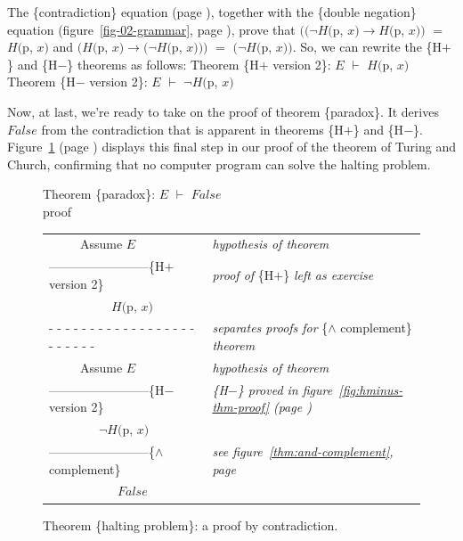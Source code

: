 The \{contradiction\} equation (page \pageref{boolean-contradiction}),
together with the \{double negation\} equation
(figure~\ref{fig-02-grammar}, page \pageref{fig-02-grammar}),
prove that
$((\neg H($\textsf{p}, $x) \rightarrow H($\textsf{p}, $x))$ $=$ $H($\textsf{p}, $x)$
and
$(H($\textsf{p}, $x) \rightarrow (\neg H($\textsf{p}, $x)))$ $=$ $(\neg H($\textsf{p}, $x))$.
So, we can rewrite the \{H$+$\} and \{H$-$\} theorems as follows:
\vspace{2mm}
\label{thm:HplusHminus}
\hspace*{5mm}Theorem \{H$+$ version 2\}: $E$ $\vdash$ $H($\textsf{p}, $x)$ \\
\hspace*{5mm}Theorem \{H$-$ version 2\}: $E$ $\vdash$ $\neg H($\textsf{p}, $x)$
\vspace{2mm}

Now, at last, we're ready to take on
the proof of theorem \{paradox\}.
It derives $False$ from the contradiction that is apparent
in theorems \{H$+$\} and \{H$-$\}.
Figure~\ref{fig:proof-paradox-thm} (page \pageref{fig:proof-paradox-thm})
displays this final step in our proof
of the theorem of Turing and Church,
confirming that no computer program can solve the halting problem.

\begin{figure}
Theorem \{paradox\}: $E$ $\vdash$ $False$\\
proof
\begin{center}
\begin{tabular}{ll}
~~~~~Assume $E$                                 &\emph{hypothesis of theorem}\\
------------------------\{H$+$ version 2\}      &\emph{proof of} \{H$+$\} \emph{left as exercise}\\
~~~~~~~~~~$H($\textsf{p}, $x)$                  &\\
 - - - - - - - - - - - - - - - - - - - - - - - -&\emph{separates proofs for} \{$\wedge$ complement\} \emph{theorem}\\
~~~~~Assume $E$                                 &\emph{hypothesis of theorem}\\
------------------------\{H$-$ version 2\}      &\emph{\{H$-$\} proved in figure~\ref{fig:hminus-thm-proof} (page \pageref{fig:hminus-thm-proof})}\\
~~~~~~~~$\neg H($\textsf{p}, $x)$               &\\
------------------------\{$\wedge$ complement\} &\emph{see figure~\ref{thm:and-complement}, page \pageref{thm:and-complement}}\\
~~~~~~~~~~~$False$                              &\\
\end{tabular}
\end{center}
\caption{Theorem \{halting problem\}: a proof by contradiction.}
\label{fig:proof-paradox-thm}
\end{figure}


